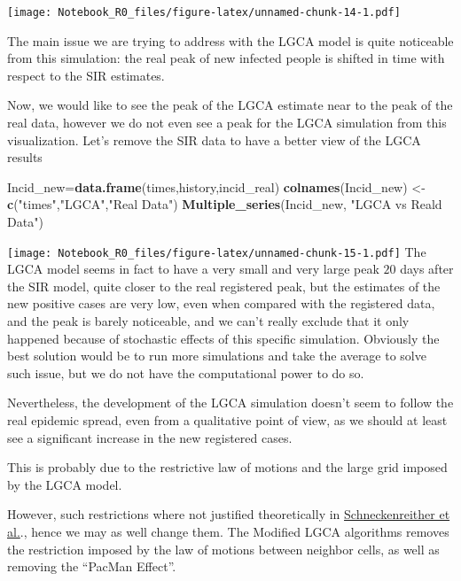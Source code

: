 \documentclass[
]{article}
\newenvironment{Shaded}{\begin{snugshade}}{\end{snugshade}}
\newcommand{\FunctionTok}[1]{\textcolor[rgb]{0.13,0.29,0.53}{\textbf{#1}}}
\newcommand{\NormalTok}[1]{#1}
\newcommand{\OtherTok}[1]{\textcolor[rgb]{0.56,0.35,0.01}{#1}}
\newcommand{\StringTok}[1]{\textcolor[rgb]{0.31,0.60,0.02}{#1}}
\begin{document}
\texttt{[image: Notebook\_R0\_files/figure-latex/unnamed-chunk-14-1.pdf]}

The main issue we are trying to address with the LGCA model is quite
noticeable from this simulation: the real peak of new infected people is
shifted in time with respect to the SIR estimates.

Now, we would like to see the peak of the LGCA estimate near to the peak
of the real data, however we do not even see a peak for the LGCA
simulation from this visualization. Let's remove the SIR data to have a
better view of the LGCA results

\begin{Shaded}
\begin{Highlighting}[]
\NormalTok{Incid\_new}\OtherTok{=}\FunctionTok{data.frame}\NormalTok{(times,history,incid\_real)}
\FunctionTok{colnames}\NormalTok{(Incid\_new) }\OtherTok{\textless{}{-}} \FunctionTok{c}\NormalTok{(}\StringTok{"times"}\NormalTok{,}\StringTok{"LGCA"}\NormalTok{,}\StringTok{"Real Data"}\NormalTok{)}
\FunctionTok{Multiple\_series}\NormalTok{(Incid\_new, }\StringTok{"LGCA vs Reald Data"}\NormalTok{)}
\end{Highlighting}
\end{Shaded}

\texttt{[image: Notebook\_R0\_files/figure-latex/unnamed-chunk-15-1.pdf]}
The LGCA model seems in fact to have a very small and very large peak
\(20\) days after the SIR model, quite closer to the real registered
peak, but the estimates of the new positive cases are very low, even
when compared with the registered data, and the peak is barely
noticeable, and we can't really exclude that it only happened because of
stochastic effects of this specific simulation. Obviously the best
solution would be to run more simulations and take the average to solve
such issue, but we do not have the computational power to do so.

Nevertheless, the development of the LGCA simulation doesn't seem to
follow the real epidemic spread, even from a qualitative point of view,
as we should at least see a significant increase in the new registered
cases.

This is probably due to the restrictive law of motions and the large
grid imposed by the LGCA model.

However, such restrictions where not justified theoretically in
\href{https://doi.org/10.1016/j.simpat.2008.05.015}{Schneckenreither et
al.}., hence we may as well change them. The Modified LGCA algorithms
removes the restriction imposed by the law of motions between neighbor
cells, as well as removing the ``PacMan Effect''.
\end{document}
